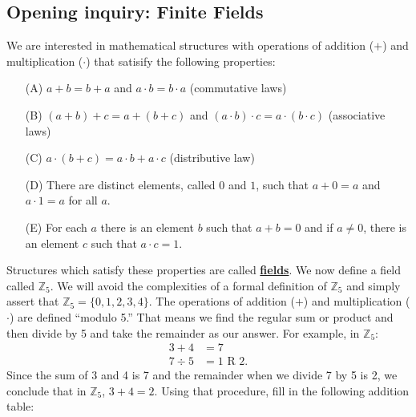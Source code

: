 \documentclass[11pt]{article}
\newenvironment{task}
	{\begin{mdframed}[linecolor=lightgray, linewidth=3pt]\raggedright}
	{\end{mdframed}}
\renewcommand\emph[1]{\underline{\bf{#1}}} %
\theoremstyle{definition}
\begin{document}




\subsection{Opening inquiry: Finite Fields}
\begin{task}
  We are interested in mathematical structures with operations of addition ($+$) and multiplication ($\cdot$) that satisify the following properties:
  \begin{itemize}
    \item[(A)] $a+b=b+a$ and $a\cdot b=b\cdot a$ (commutative laws)
    \item[(B)] $(a+b)+c = a + (b+c)$ and $(a\cdot b)\cdot c = a\cdot (b \cdot c)$ (associative laws)
    \item[(C)] $a\cdot (b+c) = a\cdot b + a \cdot c$ (distributive law)
    \item[(D)] There are distinct elements, called $0$ and $1$, such that $a+0 = a $ and $a \cdot 1 = a$ for all $a$.
    \item[(E)] For each $a$ there is an element $b$ such that $a + b = 0$ and if $a\neq 0$, there is an element $c$ such that $a\cdot c = 1$.
  \end{itemize}
  Structures which satisfy these properties are called \emph{fields}. We now define a field called $\mathbb{Z}_5$. We will avoid the complexities of a formal definition of $\mathbb{Z}_5$ and simply assert that 
  $\mathbb{Z}_5 = \{ 0, 1, 2, 3, 4\}$. The operations of addition ($+$) and multiplication ($\cdot$) are defined ``modulo 5.'' That means we find
  the regular sum or product and then divide by 5 and take the remainder as our answer. For example, in $\mathbb{Z}_5$:
  \begin{align*}
    3 + 4 &= 7\\
    7 \div 5 &= 1 \text{ R } 2.
  \end{align*}
  Since the sum of 3 and 4 is 7 and the remainder when we divide 7 by 5 is 2, we conclude that in $\mathbb{Z}_5$, $3 + 4 = 2$. Using that procedure, fill in
  the following addition table:


\end{task}
\end{document}
